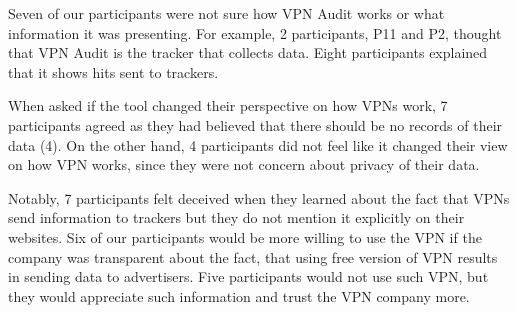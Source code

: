 Seven of our participants were not sure how VPN Audit works or what
information it was presenting. For example, 2 participants, P11 and P2,
thought that VPN Audit is the tracker that collects data. Eight participants
explained that it shows hits sent to trackers. 

When asked if the tool changed their perspective on how VPNs work, 7
participants agreed as they had believed that there should be no records of
their data (4). On the other hand, 4 participants did not feel like it changed
their view on how VPN works, since they were not concern about privacy of
their data.

Notably, 7 participants felt deceived when they learned about the fact that
VPNs send information to trackers but they do not mention it explicitly on
their websites. Six of our participants would be more willing to use the VPN
if the company was transparent about the fact, that using free version of VPN
results in sending data to advertisers. Five participants would not use such
VPN, but they would appreciate such information and trust the VPN company
more.